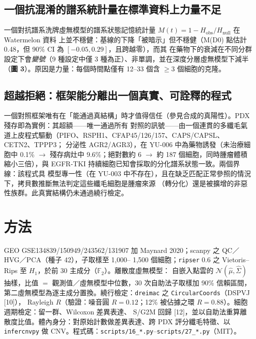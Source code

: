 \documentclass[11pt,a4paper]{article}
\begin{document}
\subsection*{一個抗混淆的譜系統計量在標準資料上力量不足}
一個對抗譜系洗牌虛無模型的譜系狀態記憶統計量 $M(t)=1-H_{\mathrm{obs}}/H_{\mathrm{null}}$ 在 Watermelon 資料
上並不穩健：基線的下降「被暗示」但不穩健（M(D0) 點估計 0.48，但 90\% CI 為 $[-0.05,0.29]$，且跨越零），而其
在藥物下的衰減在不同分群設定下會\emph{變號}（9 種設定中僅 3 種為正）、非單調，並在深度分層虛無模型下減半
（\textbf{圖 3}）。原因是力量：每個時間點僅有 12--33 個含 $\ge 3$ 個細胞的克隆。

\subsection*{超越拒絕：框架能分離出一個真實、可詮釋的程式}
一個對照框架唯有在「能通過真結構」時才值得信任（參見合成的真陽性）。PDX 殘存即為實例：其超額——唯一通過所有
對照的訊號——由一個連貫的多纖毛氣道上皮程式驅動（PIFO、RSPH1、CFAP45/126/157、CAPS/CAPSL、CETN2、TPPP3；
分泌性 AGR2/AGR3），在 YU-006 中為藥物誘發（未治療細胞中 0.1\% $\to$ 殘存病灶中 9.6\%；絕對數約 6 $\to$ 約
187 個細胞，同時腫瘤體積縮小三倍），與 EGFR-TKI 持續細胞已知會採取的分化譜系狀態一致。兩個界線：該程式具
模型專一性（在 YU-003 中不存在），且在缺乏匹配正常參照的情況下，拷貝數推斷無法判定這些纖毛細胞是腫瘤來源
（轉分化）還是被擴增的非惡性族群。此真實結構仍未通過繞行檢定。

\section{方法}
GEO GSE134839/150949/243562/131907 加 Maynard 2020；scanpy 之 QC／HVG／PCA（種子 42），子取樣至 1{,}000--
1{,}500 個細胞；\texttt{ripser} 0.6 之 Vietoris--Rips 至 $H_1$，於前 30 主成分（$\mathbb{F}_2$）。離散度虛無模型：
自嵌入點雲的 $\mathcal{N}(\hat\mu,\hat\Sigma)$ 抽樣，比值 $=$ 觀測值／虛無模型中位數，30 次自助法子取樣加 90\%
信賴區間，第二虛無模型為逐主成分置換。繞行檢定：\texttt{dreimac} 之 \texttt{CircularCoords}（DSPVJ [10]），
Rayleigh $R$（驗證：噪音圓 $R=0.12$；12\% 被佔據之環 $R=0.88$）。細胞週期檢定：留一群、Wilcoxon 差異表達、
S/G2M 回歸 [12]，並以自助法重算離散度比值。體內身分：對原始計數做差異表達、跨 PDX 評分纖毛特徵、以
\texttt{infercnvpy} 做 CNV。程式碼：\texttt{scripts/16\_*.py}--\texttt{scripts/27\_*.py}（MIT）。
\end{document}
